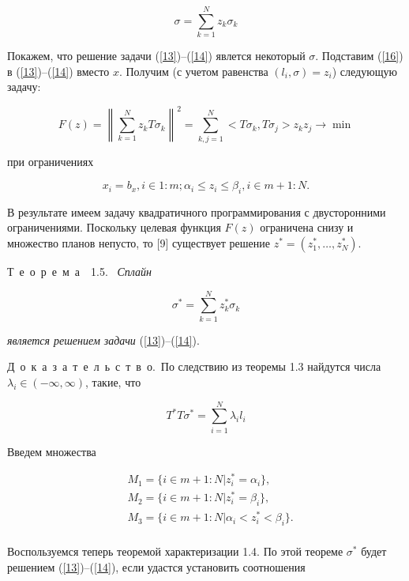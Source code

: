 \documentclass{book}
\newcommand{\theorem}[1]{Т~е~о~р~е~м~а~~#1.\ }
\newcommand{\proof}{Д~о~к~а~з~а~т~е~л~ь~с~т~в~о.\ }
\begin{document}
\begin{equation}
\sigma=\sum_{k=1}^Nz_k\sigma_k
\label{16}
\end{equation}

\par Покажем, что решение задачи (\ref{13})--(\ref{14}) явлется некоторый $\sigma$. Подставим (\ref{16}) в (\ref{13})--(\ref{14}) вместо $x$. Получим (с учетом равенства $(l_i, \sigma)=z_i$) следующую задачу:

\begin{equation*}
F(z)=\left\|\sum_{k=1}^Nz_kT\sigma_k\right\|^2=\sum_{k, j=1}^N<T\sigma_k, T\sigma_j>z_kz_j\rightarrow\min
\end{equation*}

\noindent при ограничениях

\begin{equation*}
x_i=b_x, i\in1:m; \alpha_i\leq z_i\leq\beta_i, i\in m+1:N.
\end{equation*}

\noindent В результате имеем задачу квадратичного программирования с двусторонними ограничениями. Поскольку целевая функция $F(z)$ ограничена снизу и множество планов непусто, то [9] существует решение $z^*=(z^*_1, \dots, z^*_N)$.
\par\theorem{1.5} \textit{Сплайн}

\begin{equation*}
\sigma^*=\sum_{k=1}^Nz^*_k\sigma_k
\end{equation*}

\noindent\textit{является решением задачи} (\ref{13})--(\ref{14}).
\par\proof По следствию из теоремы 1.3 найдутся числа $\lambda_i\in(-\infty, \infty)$, такие, что

\begin{equation}
T^*T\sigma^*=\sum_{i=1}^N\lambda_il_i
\label{17}
\end{equation}

\noindent Введем множества

\begin{equation*}
\begin{split}
&M_1=\{i\in m+1:N|z^*_i=\alpha_i\},\\
&M_2=\{i\in m+1:N|z^*_i=\beta_i\},\\
&M_3=\{i\in m+1:N|\alpha_i<z^*_i<\beta_i\}.\\
\end{split}
\end{equation*}

\noindent Воспользуемся теперь теоремой характеризации 1.4. По этой теореме $\sigma^*$ будет решением  (\ref{13})--(\ref{14}), если удастся установить соотношения
\end{document}
